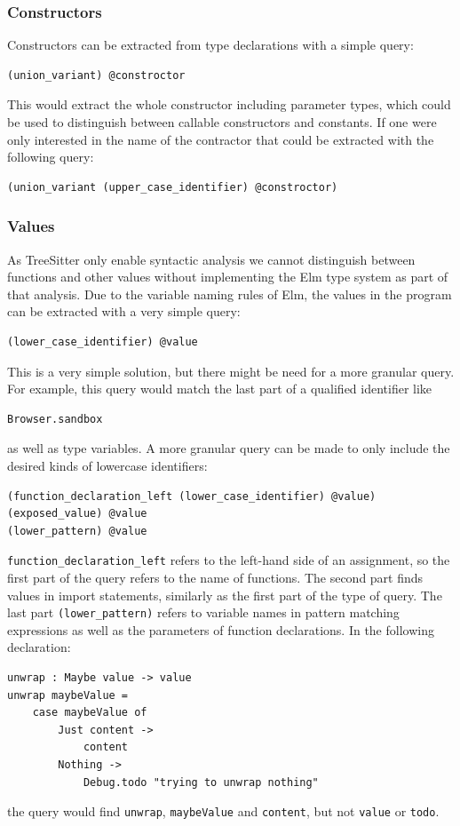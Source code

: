 \documentclass[../thesis.tex]{subfiles}
\begin{document}
\subsubsection{Constructors}
Constructors can be extracted from type declarations with a simple query:
\begin{verbatim}
(union_variant) @constroctor
\end{verbatim}
This would extract the whole constructor including parameter types, which could be used to distinguish
between callable constructors and constants.
If one were only interested in the name of the contractor that could be extracted with the following query:
\begin{verbatim}
(union_variant (upper_case_identifier) @constroctor)
\end{verbatim}

\subsubsection{Values}
As TreeSitter only enable syntactic analysis we cannot distinguish between functions and other values
without implementing the Elm type system as part of that analysis.
Due to the variable naming rules of Elm, the values in the program can be extracted with a very simple query:
\begin{verbatim}
(lower_case_identifier) @value
\end{verbatim}
This is a very simple solution, but there might be need for a more granular query.
For example, this query would match the last part of a qualified identifier like
\begin{verbatim}
Browser.sandbox
\end{verbatim}
as well as type variables.
A more granular query can be made to only include the desired kinds of lowercase identifiers:
\begin{verbatim}
(function_declaration_left (lower_case_identifier) @value)
(exposed_value) @value
(lower_pattern) @value
\end{verbatim}
\texttt{function\_declaration\_left} refers to the left-hand side of an assignment, so the first part of the query refers to the name of functions.
The second part finds values in import statements, similarly as the first part of the type of query.
The last part \texttt{(lower\_pattern)} refers to variable names in pattern matching expressions as well as the parameters of function declarations.
In the following declaration:
\begin{verbatim}
unwrap : Maybe value -> value
unwrap maybeValue =
    case maybeValue of
        Just content ->
            content
        Nothing ->
            Debug.todo "trying to unwrap nothing"
\end{verbatim}
the query would find \texttt{unwrap}, \texttt{maybeValue} and \texttt{content}, but not \texttt{value} or \texttt{todo}.
\end{document}
